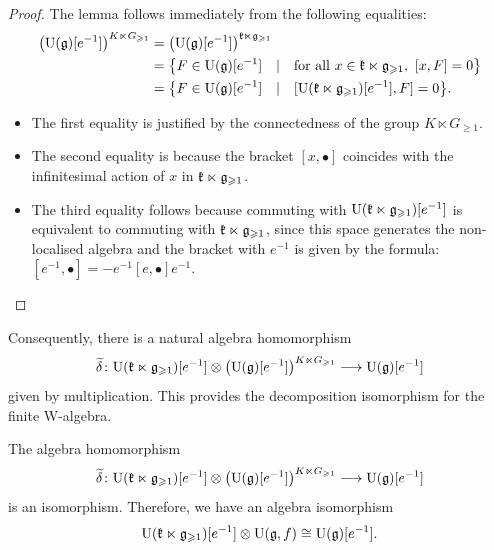 \begin{proof}
	The lemma follows immediately from the following equalities:
	\[ \begin{aligned}
		\big(\mathrm U(\mathfrak g)[e^{-1}]\big)^{K \ltimes G_{\geqslant 1}} & = \big(\mathrm U(\mathfrak g)[e^{-1}]\big)^{\mathfrak k \ltimes \mathfrak g_{\geqslant 1}} \\
		& = \big\{ F \in \mathrm U(\mathfrak g)[e^{-1}] \quad | \quad \text{for all} ~  x \in \mathfrak k \ltimes \mathfrak g_{\geqslant 1},  ~   [x, F] = 0 \big\} \\
		& = \big\{ F \in \mathrm U(\mathfrak g)[e^{-1}] \quad | \quad  [\mathrm U(\mathfrak k \ltimes \mathfrak g_{\geqslant 1})[e^{-1}], F]  = 0\big\}. 
	\end{aligned} \]
	\begin{itemize}
		\item The first equality is justified by the connectedness of the group $K \ltimes G_{\geqslant 1}$. 
		\item The second equality is because the bracket $[x, \bullet]$ coincides with the infinitesimal action of $x$ in $\mathfrak k \ltimes \mathfrak g_{\geqslant 1}$.
		
		\item The third equality follows because commuting with $\mathrm U(\mathfrak k \ltimes \mathfrak g_{\geqslant 1})[e^{-1}]$ is equivalent to commuting with $\mathfrak k \ltimes \mathfrak g_{\geqslant 1}$, since this space generates the non-localised algebra and the bracket with $e^{-1}$ is given by the formula: $[e^{-1}, \bullet] = - e^{-1} [e, \bullet] e^{-1}$.
	\end{itemize}
\end{proof}

Consequently, there is a natural algebra homomorphism
\[ \widetilde{\delta} \colon \mathrm U(\mathfrak k \ltimes \mathfrak g_{\geqslant 1})[e^{-1}] \otimes \big(\mathrm U(\mathfrak g)[e^{-1}]\big)^{K \ltimes G_{\geqslant 1}} \longrightarrow \mathrm U(\mathfrak g)[e^{-1}] \]
given by multiplication. This provides the decomposition isomorphism for the finite W-algebra.

\begin{theorem} \label{theorem:decomposition-quantum}
	The algebra homomorphism
	\[ \widetilde{\delta} \colon \mathrm U(\mathfrak k \ltimes \mathfrak g_{\geqslant 1})[e^{-1}] \otimes \big(\mathrm U(\mathfrak g)[e^{-1}]\big)^{K \ltimes G_{\geqslant 1}} \longrightarrow \mathrm U(\mathfrak g)[e^{-1}] \]
	is an isomorphism. Therefore, we have an algebra isomorphism
	\[ \mathrm U(\mathfrak k \ltimes \mathfrak g_{\geqslant 1})[e^{-1}] \otimes \mathrm U(\mathfrak g, f) \cong \mathrm U(\mathfrak g)[e^{-1}]. \]
\end{theorem}

